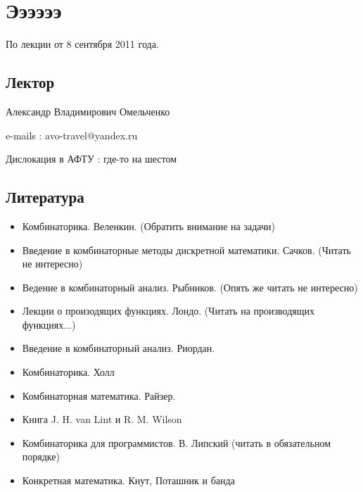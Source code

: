 \chapter{Ээээээ}

По лекции от 8 сентября 2011 года.

\section{Лектор}

{\large Александр Владимирович Омельченко}
\par\bigskip

e-mails : \hfill avo-travel@yandex.ru
\par\bigskip

Дислокация в АФТУ : \hfill где-то на шестом
\par\bigskip

\section{Литература}

\begin{itemize}
\item Комбинаторика. Веленкин. (Обратить внимание на задачи)

\item Введение в комбинаторные методы дискретной математики. Сачков. (Читать не интересно)

\item Ведение в комбинаторный анализ. Рыбников. (Опять же читать не интересно)

\item Лекции о произодящих функциях. Лондо. (Читать на производящих функциях...)

\item Введение в комбинаторный анализ. Риордан.

\item Комбинаторика. Холл

\item Комбинаторная математика. Райзер.

\item Книга J. H. van Lint и R. M. Wilson

\item Комбинаторика для программистов. В. Липский (читать в обязательном порядке)

\item Конкретная математика. Кнут, Поташник и банда
\end{itemize}

